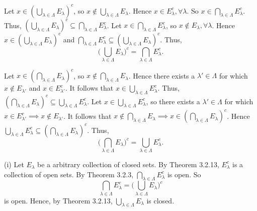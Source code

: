 \documentclass{article}
\begin{document}
            Let $x \in (\bigcup_{\lambda \in \Lambda} E_\lambda)^c$, so $x \notin \bigcup_{\lambda \in \Lambda} E_\lambda$. Hence $x \in E^c_\lambda, \forall \lambda$. So $x \in \bigcap_{\lambda \in \Lambda} E^c_\lambda$. Thus, $(\bigcup_{\lambda \in \Lambda} E_\lambda)^c \subseteq \bigcap_{\lambda \in \Lambda} E^c_\lambda$. Let $x \in \bigcap_{\lambda \in \Lambda} E^c_\lambda$, so $x \notin E_\lambda, \forall \lambda$. Hence $x \in (\bigcup_{\lambda \in \Lambda} E_\lambda)^c$ and $\bigcap_{\lambda \in \Lambda} E^c_\lambda \subseteq (\bigcup_{\lambda \in \Lambda} E_\lambda)^c$. Thus,
            \begin{equation*}
                \Bigg(\bigcup_{\lambda \in \Lambda} E_\lambda \Bigg)^c = \bigcap_{\lambda \in \Lambda} E^c_\lambda.
            \end{equation*}
            
            Let $x \in (\bigcap_{\lambda \in \Lambda} E_\lambda)^c$, so $x \notin \bigcap_{\lambda \in \Lambda} E_\lambda$. Hence there exists a $\lambda' \in \Lambda$ for which $x \notin E_{\lambda'}$ and $x \in E^c_{\lambda'}$. It follows that $x \in \bigcup_{\lambda \in \Lambda} E^c_\lambda$. Thus, $(\bigcap_{\lambda \in \Lambda} E_\lambda)^c \subseteq \bigcup_{\lambda \in \Lambda} E^c_\lambda$. Let $x \in \bigcup_{\lambda \in \Lambda} E^c_\lambda$, so there exists a $\lambda' \in \Lambda$ for which $x \in E^c_{\lambda'} \implies x \notin E_{\lambda'}$. It follows that $x \notin \bigcap_{\lambda \in \Lambda} E_\lambda \implies x \in (\bigcap_{\lambda \in \Lambda} E_\lambda)^c$. Hence $\bigcup_{\lambda \in \Lambda} E^c_\lambda \subseteq (\bigcap_{\lambda \in \Lambda} E_\lambda)^c$. Thus,
            \begin{equation*}
                \Bigg(\bigcap_{\lambda \in \Lambda} E_\lambda \Bigg)^c = \bigcup_{\lambda \in \Lambda} E^c_\lambda.
            \end{equation*}
            
            (i) Let $E_\lambda$ be a arbitrary collection of closed sets. By Theorem 3.2.13, $E^c_\lambda$ is a collection of open sets. By Theorem 3.2.3, $\bigcap_{\lambda \in \Lambda} E^c_\lambda$ is open. So
            \begin{equation*}
                \bigcap_{\lambda \in \Lambda} E^c_\lambda = \Bigg(\bigcup_{\lambda \in \Lambda} E_\lambda \Bigg)^c
            \end{equation*}
            is open. Hence, by Theorem 3.2.13, $\bigcup_{\lambda \in \Lambda} E_\lambda$ is closed.
            
\end{document}
